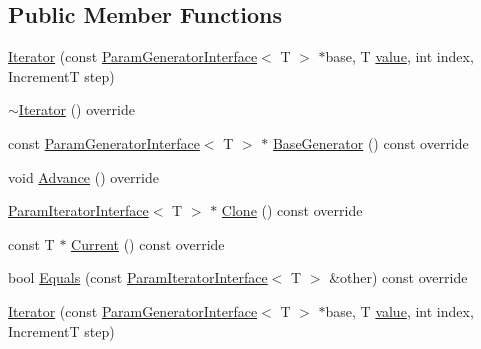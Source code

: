 \subsection*{Public Member Functions}
\begin{DoxyCompactItemize}
\item 
\mbox{\hyperlink{classtesting_1_1internal_1_1_range_generator_1_1_iterator_a960184d2ea0ff223d9cf4d6ab015baa8}{Iterator}} (const \mbox{\hyperlink{classtesting_1_1internal_1_1_param_generator_interface}{Param\+Generator\+Interface}}$<$ T $>$ $\ast$base, T \mbox{\hyperlink{_obj__test_2lib_2googletest-master_2googlemock_2test_2gmock-matchers__test_8cc_a337b8a670efc0b086ad3af163f3121b6}{value}}, int index, IncrementT step)
\item 
\mbox{\hyperlink{classtesting_1_1internal_1_1_range_generator_1_1_iterator_a09f0f9f1d40f7a3d04e4e82f7274b2ab}{$\sim$\+Iterator}} () override
\item 
const \mbox{\hyperlink{classtesting_1_1internal_1_1_param_generator_interface}{Param\+Generator\+Interface}}$<$ T $>$ $\ast$ \mbox{\hyperlink{classtesting_1_1internal_1_1_range_generator_1_1_iterator_aa1dc4151e1eed1c546059ecb4f72440b}{Base\+Generator}} () const override
\item 
void \mbox{\hyperlink{classtesting_1_1internal_1_1_range_generator_1_1_iterator_ad17bd99e352c43b8ab654a4ad479d06e}{Advance}} () override
\item 
\mbox{\hyperlink{classtesting_1_1internal_1_1_param_iterator_interface}{Param\+Iterator\+Interface}}$<$ T $>$ $\ast$ \mbox{\hyperlink{classtesting_1_1internal_1_1_range_generator_1_1_iterator_a61a764294b66272d730f5ff5e0acdcf4}{Clone}} () const override
\item 
const T $\ast$ \mbox{\hyperlink{classtesting_1_1internal_1_1_range_generator_1_1_iterator_acbdfc5919d37fb9514914afb041e50ff}{Current}} () const override
\item 
bool \mbox{\hyperlink{classtesting_1_1internal_1_1_range_generator_1_1_iterator_a534406abbddb137d7672c2b53d5bff0b}{Equals}} (const \mbox{\hyperlink{classtesting_1_1internal_1_1_param_iterator_interface}{Param\+Iterator\+Interface}}$<$ T $>$ \&other) const override
\item 
\mbox{\hyperlink{classtesting_1_1internal_1_1_range_generator_1_1_iterator_a960184d2ea0ff223d9cf4d6ab015baa8}{Iterator}} (const \mbox{\hyperlink{classtesting_1_1internal_1_1_param_generator_interface}{Param\+Generator\+Interface}}$<$ T $>$ $\ast$base, T \mbox{\hyperlink{_obj__test_2lib_2googletest-master_2googlemock_2test_2gmock-matchers__test_8cc_a337b8a670efc0b086ad3af163f3121b6}{value}}, int index, IncrementT step)

\end{DoxyCompactItemize}
